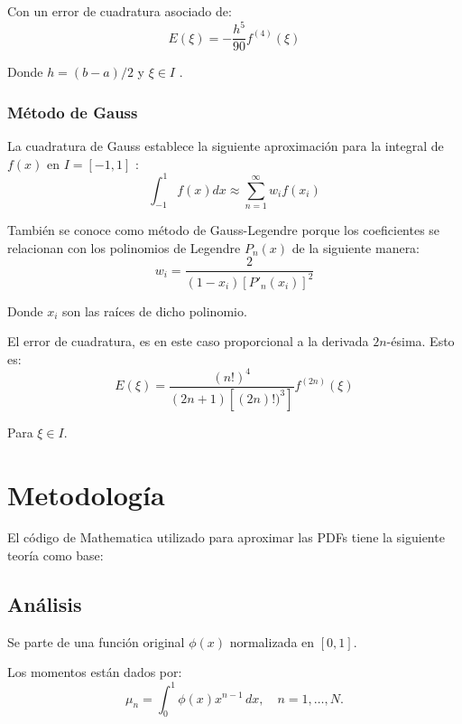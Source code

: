 \documentclass[titlepage,11pt]{report}
\begin{document}
Con un error de cuadratura asociado de:
\begin{equation*}
    E(\xi)=-\frac{h^5}{90}f^{(4)}(\xi)
\end{equation*}

Donde $h=(b-a)/2$ y $\xi\in I$ \cite{07a21022-7e5e-3495-8122-12bedc23c3f3}.

\subsection{Método de Gauss}

La cuadratura de Gauss establece la siguiente aproximación para la integral de $f(x)$ en $I=[-1,1]$ \cite{burden2015numerical}:
\begin{equation*}
    \int_{-1}^{1}f(x)dx\approx \sum_{n=1}^{\infty}w_if(x_i)
\end{equation*}

También se conoce como método de Gauss-Legendre porque los coeficientes se relacionan con los polinomios de Legendre $P_n(x)$ de la siguiente manera:
\begin{equation*}
    w_i=\frac{2}{(1-x_i)[P'_n(x_i)]^2}
\end{equation*}

Donde $x_i$ son las raíces de dicho polinomio.

El error de cuadratura, es en este caso proporcional a la derivada $2n$-ésima. Esto es:
\begin{equation*}
    E(\xi)=\frac{(n!)^4}{(2n+1)[(2n)!)^3]}f^{(2n)}(\xi)
\end{equation*}

Para $\xi\in I$.


\chapter{Metodología}
\label{sec:metodologia}

El código de Mathematica utilizado para aproximar las PDFs tiene la siguiente teoría como base:

\section{Análisis}

Se parte de una función original $\phi(x)$ normalizada en $[0,1]$.

Los momentos están dados por:
\begin{equation*}
    \mu_n = \int_0^1 \phi(x) x^{n-1} \, dx, \quad n = 1, \dots, N.
\end{equation*}
    
\end{document}

